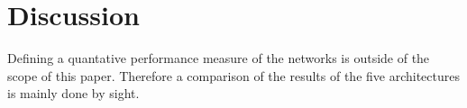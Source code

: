 \section{Discussion}

Defining a quantative performance measure of the networks is outside of the scope of this paper. Therefore a comparison of the results of the five architectures is mainly done by sight.









